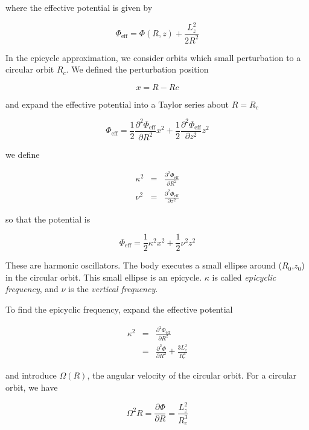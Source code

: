 where the effective potential is given by 

\begin{equation}
\varPhi_\mathrm{eff} = \varPhi(R,z) + \frac{L_z^2}{2R^2}
\end{equation}

In the epicycle approximation, we consider orbits which small perturbation to a circular orbit $R_c$. We defined the perturbation position 

\begin{equation}
x = R - Rc
\end{equation}

and expand the effective potential into a Taylor series about $R=R_c$ 


\begin{equation}
\varPhi_\mathrm{eff} = \frac{1}{2}\frac{\partial^2 \varPhi_\mathrm{eff}}{\partial R^2} x^2 + \frac{1}{2}\frac{\partial^2 \varPhi_\mathrm{eff}}{\partial z^2} z^2
\end{equation}


we define 

\begin{eqnarray}
\kappa^2 &=& \frac{\partial^2 \varPhi_\mathrm{eff}}{\partial R^2} \\
\nu^2 &=& \frac{\partial^2 \varPhi_\mathrm{eff}}{\partial z^2} 
\end{eqnarray}

so that the potential is 

\begin{equation}
\varPhi_\mathrm{eff} = \frac{1}{2}\kappa^2 x^2 + \frac{1}{2}\nu^2 z^2
\end{equation}

These are harmonic oscillators. The body executes a small ellipse around ($R_0$,$z_0$) in the circular orbit. This small ellipse is an epicycle. $\kappa$ is called {\it epicyclic  frequency}, and $\nu$ is the {\it vertical frequency}.

To find the epicyclic frequency, expand the effective potential 

\begin{eqnarray}
\kappa^2 &=& \frac{\partial^2 \varPhi_\mathrm{eff}}{\partial R^2}\\
&=& \frac{\partial^2 \varPhi}{\partial R^2} + \frac{3L_z^2}{R_c^4}
\end{eqnarray}

and introduce $\Omega(R)$, the angular velocity of the circular orbit. For a circular orbit, we have 


\begin{equation}
\Omega^2 R = \frac{\partial \varPhi}{\partial R} = \frac{L_z^2}{R_c^3} 
\end{equation}


